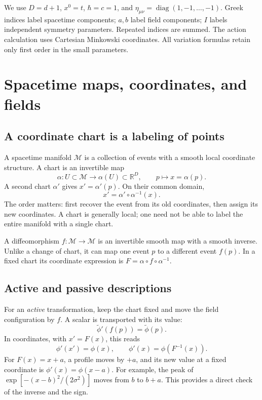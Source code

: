 \documentclass[11pt]{article}
\newcommand{\R}{\mathbb{R}}
\newcommand{\cM}{\mathcal{M}}
\begin{document}
\begin{keyidea}[Conventions]
We use \(D=d+1\), \(x^0=t\), \(\hbar=c=1\), and
\(\eta_{\mu\nu}=\operatorname{diag}(1,-1,\ldots,-1)\).
Greek indices label spacetime components; \(a,b\) label field components;
\(I\) labels independent symmetry parameters. Repeated indices are summed.
The action calculation uses Cartesian Minkowski coordinates.
All variation formulas retain only first order in the small parameters.
\end{keyidea}

\section{Spacetime maps, coordinates, and fields}

\subsection{A coordinate chart is a labeling of points}
A spacetime manifold \(\cM\) is a collection of events with a smooth local
coordinate structure. A chart is an invertible map
\begin{equation}
\alpha:U\subset\cM\longrightarrow\alpha(U)\subset\R^D,
\qquad p\longmapsto x=\alpha(p).
\end{equation}
A second chart \(\alpha'\) gives \(x'=\alpha'(p)\). On their common domain,
\begin{equation}
\boxed{x'=\alpha'\circ\alpha^{-1}(x).}
\label{eq:charts}
\end{equation}
The order matters: first recover the event from its old coordinates, then
assign its new coordinates. A chart is generally local; one need not be
able to label the entire manifold with a single chart.

A diffeomorphism \(f:\cM\to\cM\) is an invertible smooth map with a smooth
inverse. Unlike a change of chart, it can map one event \(p\) to a different
event \(f(p)\). In a fixed chart its coordinate expression is
\(F=\alpha\circ f\circ\alpha^{-1}\).

\subsection{Active and passive descriptions}
For an \emph{active} transformation, keep the chart fixed and move the
field configuration by \(f\). A scalar is transported with its value:
\begin{equation}
\widetilde\phi'(f(p))=\widetilde\phi(p).
\end{equation}
In coordinates, with \(x'=F(x)\), this reads
\begin{equation}
\boxed{\phi'(x')=\phi(x),\qquad
\phi'(x)=\phi(F^{-1}(x)).}
\label{eq:activeScalar}
\end{equation}
For \(F(x)=x+a\), a profile moves by \(+a\), and its new value at a fixed
coordinate is \(\phi'(x)=\phi(x-a)\). For example, the peak of
\(\exp[-(x-b)^2/(2\sigma^2)]\) moves from \(b\) to \(b+a\).
This provides a direct check of the inverse and the sign.
\end{document}
